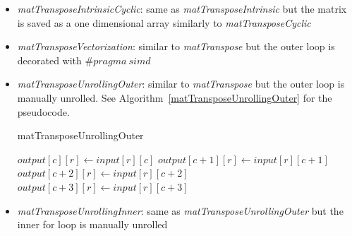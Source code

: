 \documentclass[conference]{IEEEtran}
\begin{document}
\begin{itemize}
\begin{algorithm}
\begin{algorithmic}[1]
    \end{algorithmic}
    \end{algorithm}

\item \textit{matTransposeIntrinsicCyclic}: same as \textit{matTransposeIntrinsic} but the matrix is saved as a one dimensional array similarly to \textit{matTransposeCyclic}
\item \textit{matTransposeVectorization}: similar to \textit{matTranspose} but the outer loop is decorated with $\# pragma\ simd $
\item \textit{matTransposeUnrollingOuter}: similar to \textit{matTranspose} but the outer loop is manually unrolled. See Algorithm~\ref{matTransposeUnrollingOuter} for the pseudocode.

  \begin{algorithm}
    \caption{matTransposeUnrollingOuter}\label{matTransposeUnrollingOuter}
    \begin{algorithmic}[1]
            \State $output[c][r] \gets input[r][c]$
            \State $output[c+1][r] \gets input[r][c+1]$
            \State $output[c+2][r] \gets input[r][c+2]$
            \State $output[c+3][r] \gets input[r][c+3]$
            \EndFor
        \EndFor
    \end{algorithmic}
  \end{algorithm}

\item \textit{matTransposeUnrollingInner}: same as \textit{matTransposeUnrollingOuter} but the inner for loop is manually unrolled

\end{itemize}
\end{document}
